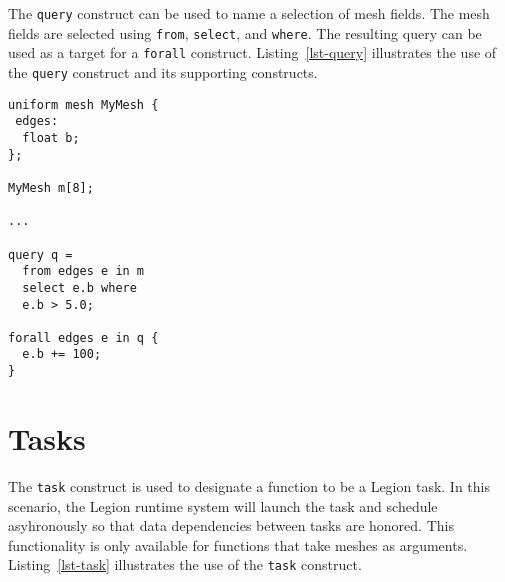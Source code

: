 


The \texttt{query} construct can be used to name a selection of mesh fields.  
The mesh fields are selected using \texttt{from}, \texttt{select}, and \texttt{where}.
The resulting query can be used as a target for a \texttt{forall} construct.
Listing~\ref{lst-query} illustrates the use of the \texttt{query} construct and its supporting constructs.

\par\bigskip
\begin{lstlisting}[float=h,label=lst-query,
	caption={Subsetting using \texttt{query} construct.}]
uniform mesh MyMesh {
 edges:
  float b;
};

MyMesh m[8];

...

query q = 
  from edges e in m 
  select e.b where 
  e.b > 5.0;

forall edges e in q {
  e.b += 100;
}

\end{lstlisting}
\par\bigskip\noindent

\section{Tasks}

The \texttt{task} construct is used to designate a function to be a Legion task.  In this scenario,
the Legion runtime system will launch the task and schedule asyhronously so that data dependencies between tasks
are honored.  This functionality is only available for functions that take meshes as arguments.
Listing~\ref{lst-task} illustrates the use of the \texttt{task} construct. 

